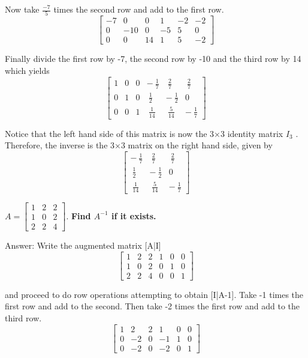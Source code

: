 \documentclass{article}
\begin{document}
\begin{description}[style=nextline]
Now take  $\frac{-7}{5}$  times the second row and add to the first row.
$$\left[ \begin{array}{rrr|rrr} -7 & 0 & 0 & 1 & -2 & -2 \\ 0 & -10 & 0 & -5 & 5 & 0 \\ 0 & 0 & 14 & 1 & 5 & -2 \end{array} \right]$$

Finally divide the first row by -7, the second row by -10 and the third row by 14 which yields
$$\left[ \begin{array}{rrr|rrr} 1 & 0 & 0 & - \ \frac{1}{7} & \ \frac{2}{7} & \ \frac{2}{7} \\ 0 & 1 & 0 & \ \frac{1}{2} & - \ \frac{1}{2} & 0 \\ 0 & 0 & 1 & \ \frac{1}{14} & \ \frac{5}{14} & - \ \frac{1}{7} \end{array} \right]$$

Notice that the left hand side of this matrix is now the  3×3  identity matrix  $I_3$ . Therefore, the inverse is the  3×3  matrix on the right hand side, given by
$$\left[ \begin{array}{rrr} - \ \frac{1}{7} & \ \frac{2}{7} & \ \frac{2}{7} \\ \ \frac{1}{2} & - \ \frac{1}{2} & 0 \\ \ \frac{1}{14} & \ \frac{5}{14} & - \ \frac{1}{7} \end{array} \right]$$

\item[Question 11: Let]
$A=\left[ \begin{array}{rrr} 1 & 2 & 2 \\ 1 & 0 & 2 \\ 2 & 2 & 4 \end{array} \right]$. \textbf{Find $A^{-1}$ if it exists.}

Answer: Write the augmented matrix  [A|I] 
$$\left[ \begin{array}{rrr|rrr} 1 & 2 & 2 & 1 & 0 & 0 \\ 1 & 0 & 2 & 0 & 1 & 0 \\ 2 & 2 & 4 & 0 & 0 & 1 \end{array} \right]$$

and proceed to do row operations attempting to obtain  [I|A-1].  Take -1 times the first row and add to the second. Then take -2 times the first row and add to the third row.
$$\left[ \begin{array}{rrr|rrr} 1 & 2 & 2 & 1 & 0 & 0 \\ 0 & -2 & 0 & -1 & 1 & 0 \\ 0 & -2 & 0 & -2 & 0 & 1 \end{array} \right]$$


\end{description}
\end{document}
